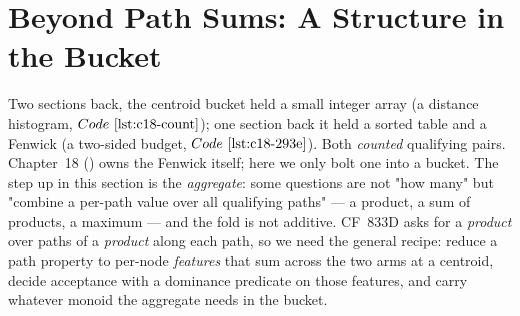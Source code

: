 \section{Beyond Path Sums: A Structure in the Bucket}\label{sec:c18-beyond}

\begin{previouslybox}
Two sections back, the centroid bucket held a small integer array (a distance
histogram, \(\coderef{c18-count}\)); one section back it held a sorted table and a
Fenwick (a two-sided budget, \(\coderef{c18-293e}\)). Both \emph{counted} qualifying
pairs. Chapter~18 () owns the Fenwick itself; here we only bolt one into a
bucket. The step up in this section is the \emph{aggregate}: some questions are not
"how many" but "combine a per-path value over all qualifying paths" --- a product, a
sum of products, a maximum --- and the fold is not additive. CF~833D asks for a
\emph{product} over paths of a \emph{product} along each path, so we need the general
recipe: reduce a path property to per-node \emph{features} that sum across the two arms
at a centroid, decide acceptance with a dominance predicate on those features, and carry
whatever monoid the aggregate needs in the bucket.
\end{previouslybox}

